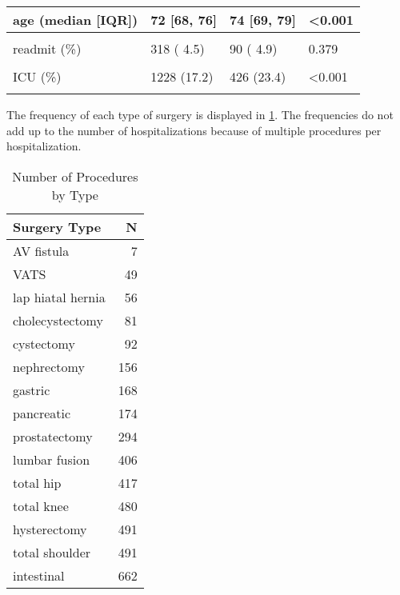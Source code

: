 \documentclass[
]{article}
\begin{document}
\begin{longtable}[t]{l|l|l|l}
\hline
age (median [IQR]) & 72 [68, 76] & 74 [69, 79] & <0.001\\
\hline
\cellcolor{gray!6}{\cellcolor{gray!6}{dc\_home (\%)}} & \cellcolor{gray!6}{\cellcolor{gray!6}{1139 (16.0)}} & \cellcolor{gray!6}{\cellcolor{gray!6}{662 (36.3)}} & \cellcolor{gray!6}{\cellcolor{gray!6}{<0.001}}\\
\hline
readmit (\%) & 318 ( 4.5) & 90 ( 4.9) & 0.379\\
\hline
\cellcolor{gray!6}{\cellcolor{gray!6}{death (\%)}} & \cellcolor{gray!6}{\cellcolor{gray!6}{164 ( 2.3)}} & \cellcolor{gray!6}{\cellcolor{gray!6}{109 ( 6.0)}} & \cellcolor{gray!6}{\cellcolor{gray!6}{<0.001}}\\
\hline
ICU (\%) & 1228 (17.2) & 426 (23.4) & <0.001\\
\hline
\cellcolor{gray!6}{\cellcolor{gray!6}{los (median [IQR])}} & \cellcolor{gray!6}{\cellcolor{gray!6}{4 [2, 9]}} & \cellcolor{gray!6}{\cellcolor{gray!6}{5 [2, 11]}} & \cellcolor{gray!6}{\cellcolor{gray!6}{<0.001}}\\
\hline
\end{longtable}

The frequency of each type of surgery is displayed in \ref{tab:descType}. The frequencies do not add up to the number of hospitalizations because of multiple procedures per hospitalization.

\begin{table}

\caption{\label{tab:tabletwo}\label{tab:descType}Number of Procedures by Type}
\centering
\begin{tabular}[t]{l|r}
\hline
Surgery Type & N\\
\hline
AV fistula & 7\\
\hline
VATS & 49\\
\hline
lap hiatal hernia & 56\\
\hline
cholecystectomy & 81\\
\hline
cystectomy & 92\\
\hline
nephrectomy & 156\\
\hline
gastric & 168\\
\hline
pancreatic & 174\\
\hline
prostatectomy & 294\\
\hline
lumbar fusion & 406\\
\hline
total hip & 417\\
\hline
total knee & 480\\
\hline
hysterectomy & 491\\
\hline
total shoulder & 491\\
\hline
intestinal & 662\\
\hline
\end{tabular}
\end{table}
\end{document}
